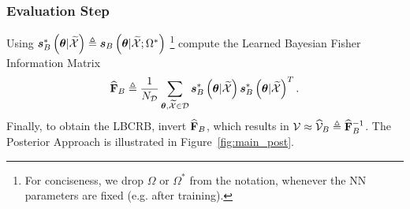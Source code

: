 \subsubsection{\textbf{Evaluation Step}} %
{Using} %
{
$\bm{s}_{B}^*\left(\bm{\theta}|\widetilde{\mathcal{X}}\right) \triangleq \bm{s}_{B}\left(\bm{\theta}|\widetilde{\mathcal{X}};\Omega^*\right)$
} \footnote{\label{fn:model}%
For conciseness, we drop $\Omega$ or $\Omega^*$ from the notation, whenever the NN parameters are fixed (e.g. after training). }  
compute the Learned Bayesian Fisher Information Matrix %
\begin{equation}\label{eq:mean_fully}
    \widehat{\mathbf{F}}_{B}\triangleq \frac{1}{N_{\mathcal{D}}}\sum_{\bm{\theta},\widetilde{\mathcal{X}}\in\mathcal{D}}\bm{s}_{B}^*\left(\bm{\theta}|\widetilde{\mathcal{X}}\right)\bm{s}_{B}^*\left(\bm{\theta}|\widetilde{\mathcal{X}}\right)^T.
\end{equation}
Finally, to obtain the LBCRB, invert $\widehat{\mathbf{F}}_{B}$, which results in ${\mathcal{V}}\approx\widehat{\mathcal{V}}_{B}\triangleq\widehat{\mathbf{F}}_{B}^{-1}$.  
The Posterior Approach is illustrated in Figure~\ref{fig:main_post}. 

